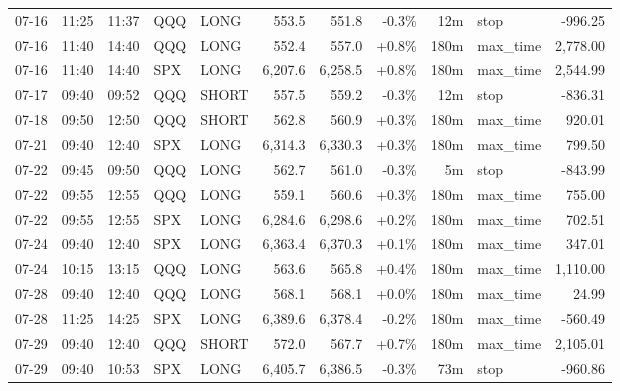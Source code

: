 \documentclass[11pt,a4paper,twoside]{article}
\begin{document}
\begin{center}
\begin{longtable}{>{\color{txtmain}}l l l l l r r r r >{\color{txtmain}}l r}
07-16 & 11:25 & 11:37 & QQQ & LONG & 553.5 & 551.8 & \textcolor{lossred}{-0.3\%} & 12m & stop & \textcolor{lossred}{-996.25} \\
07-16 & 11:40 & 14:40 & QQQ & LONG & 552.4 & 557.0 & \textcolor{wingreen}{+0.8\%} & 180m & max\_time & \textcolor{wingreen}{2,778.00} \\
07-16 & 11:40 & 14:40 & SPX & LONG & 6,207.6 & 6,258.5 & \textcolor{wingreen}{+0.8\%} & 180m & max\_time & \textcolor{wingreen}{2,544.99} \\
07-17 & 09:40 & 09:52 & QQQ & SHORT & 557.5 & 559.2 & \textcolor{lossred}{-0.3\%} & 12m & stop & \textcolor{lossred}{-836.31} \\
07-18 & 09:50 & 12:50 & QQQ & SHORT & 562.8 & 560.9 & \textcolor{wingreen}{+0.3\%} & 180m & max\_time & \textcolor{wingreen}{920.01} \\
07-21 & 09:40 & 12:40 & SPX & LONG & 6,314.3 & 6,330.3 & \textcolor{wingreen}{+0.3\%} & 180m & max\_time & \textcolor{wingreen}{799.50} \\
07-22 & 09:45 & 09:50 & QQQ & LONG & 562.7 & 561.0 & \textcolor{lossred}{-0.3\%} & 5m & stop & \textcolor{lossred}{-843.99} \\
07-22 & 09:55 & 12:55 & QQQ & LONG & 559.1 & 560.6 & \textcolor{wingreen}{+0.3\%} & 180m & max\_time & \textcolor{wingreen}{755.00} \\
07-22 & 09:55 & 12:55 & SPX & LONG & 6,284.6 & 6,298.6 & \textcolor{wingreen}{+0.2\%} & 180m & max\_time & \textcolor{wingreen}{702.51} \\
07-24 & 09:40 & 12:40 & SPX & LONG & 6,363.4 & 6,370.3 & \textcolor{wingreen}{+0.1\%} & 180m & max\_time & \textcolor{wingreen}{347.01} \\
07-24 & 10:15 & 13:15 & QQQ & LONG & 563.6 & 565.8 & \textcolor{wingreen}{+0.4\%} & 180m & max\_time & \textcolor{wingreen}{1,110.00} \\
07-28 & 09:40 & 12:40 & QQQ & LONG & 568.1 & 568.1 & \textcolor{wingreen}{+0.0\%} & 180m & max\_time & \textcolor{wingreen}{24.99} \\
07-28 & 11:25 & 14:25 & SPX & LONG & 6,389.6 & 6,378.4 & \textcolor{lossred}{-0.2\%} & 180m & max\_time & \textcolor{lossred}{-560.49} \\
07-29 & 09:40 & 12:40 & QQQ & SHORT & 572.0 & 567.7 & \textcolor{wingreen}{+0.7\%} & 180m & max\_time & \textcolor{wingreen}{2,105.01} \\
07-29 & 09:40 & 10:53 & SPX & LONG & 6,405.7 & 6,386.5 & \textcolor{lossred}{-0.3\%} & 73m & stop & \textcolor{lossred}{-960.86} \\

\end{longtable}
\end{center}
\end{document}
